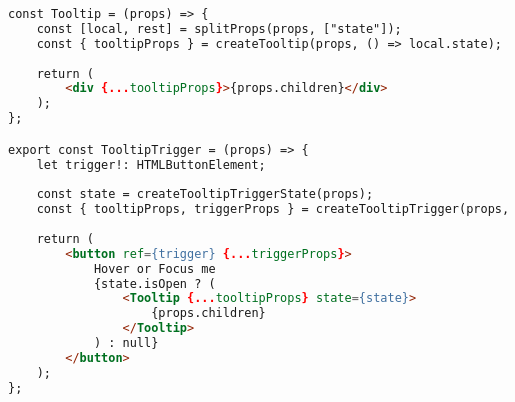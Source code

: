 \begin{lstlisting}[caption={Ukázka použití Tooltipu}, label={tooltip-example}, language=html]
const Tooltip = (props) => {
    const [local, rest] = splitProps(props, ["state"]);
    const { tooltipProps } = createTooltip(props, () => local.state);
    
    return (
        <div {...tooltipProps}>{props.children}</div>
    );
};

export const TooltipTrigger = (props) => {
    let trigger!: HTMLButtonElement;
    
    const state = createTooltipTriggerState(props);
    const { tooltipProps, triggerProps } = createTooltipTrigger(props, state, () => trigger);
    
    return (
        <button ref={trigger} {...triggerProps}>
            Hover or Focus me
            {state.isOpen ? (
                <Tooltip {...tooltipProps} state={state}>
                    {props.children}
                </Tooltip>
            ) : null}
        </button>
    );
};

\end{lstlisting}
